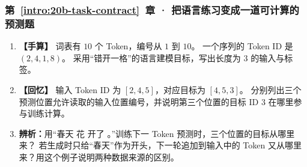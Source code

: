 \subsubsection*{第~\ref*{intro:20b-task-contract}~章 · 把语言练习变成一道可计算的预测题}
\begin{enumerate}[label={},leftmargin=4.8em,itemsep=4pt]
\item[\textbf{C-040.}] \leavevmode{}\label{exercise:C-040}\label{exercise:shifted-token-targets}\label{exercise:linked-20b-task-contract}  \textbf{【手算】} 词表有 $10$ 个 Token，编号从 $1$ 到 $10$。
一个序列的 Token ID 是 $(2,4,1,8)$。
采用“错开一格”的语言建模目标，写出长度为 $3$ 的输入与标签。
\item[\textbf{C-041.}] \leavevmode{}\label{exercise:C-041}\label{exercise:causal-target-visibility}\textbf{【回忆】} 输入 Token ID 为 $[2,4,5]$，对应目标为 $[4,5,3]$。
分别列出三个预测位置允许读取的输入位置编号，并说明第三个位置的目标 ID $3$ 在哪里参与训练计算。
\item[\textbf{C-042.}] \leavevmode{}\label{exercise:C-042}\label{exercise:training-generation-data}\textbf{辨析：}用“春天 花 开了 。”训练下一 Token 预测时，三个位置的目标从哪里来？
若生成时只给“春天”作为开头，下一轮追加到输入中的 Token 又从哪里来？用这个例子说明两种数据来源的区别。
\end{enumerate}
